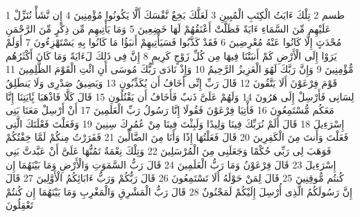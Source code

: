 \documentclass[20pt,a4paper]{article}
\title{}
\author{}
\date{}
\begin{document}
\pagecolor{cl_page}



{\tiny\colorbox{cl_aya}{1}} طسم
{\tiny\colorbox{cl_aya}{2}} تِلْكَ ءَايَتُ الْكِتَبِ الْمُبِينِ
{\tiny\colorbox{cl_aya}{3}} لَعَلَّكَ بَخِعٌ نَّفْسَكَ أَلَّا يَكُونُوا مُؤْمِنِينَ
{\tiny\colorbox{cl_aya}{4}} إِن نَّشَأْ نُنَزِّلْ عَلَيْهِم مِّنَ السَّمَاءِ ءَايَةً فَظَلَّتْ أَعْنَقُهُمْ لَهَا خَضِعِينَ
{\tiny\colorbox{cl_aya}{5}} وَمَا يَأْتِيهِم مِّن ذِكْرٍ مِّنَ الرَّحْمَنِ مُحْدَثٍ إِلَّا كَانُوا عَنْهُ مُعْرِضِينَ
{\tiny\colorbox{cl_aya}{6}} فَقَدْ كَذَّبُوا فَسَيَأْتِيهِمْ أَنبَؤُا مَا كَانُوا بِهِ يَسْتَهْزِءُونَ
{\tiny\colorbox{cl_aya}{7}} أَوَلَمْ يَرَوْا إِلَى الْأَرْضِ كَمْ أَنبَتْنَا فِيهَا مِن كُلِّ زَوْجٍ كَرِيمٍ
{\tiny\colorbox{cl_aya}{8}} إِنَّ فِى ذَلِكَ لَءَايَةً وَمَا كَانَ أَكْثَرُهُم مُّؤْمِنِينَ
{\tiny\colorbox{cl_aya}{9}} وَإِنَّ رَبَّكَ لَهُوَ الْعَزِيزُ الرَّحِيمُ
{\tiny\colorbox{cl_aya}{10}} وَإِذْ نَادَى رَبُّكَ مُوسَى أَنِ ائْتِ الْقَوْمَ الظَّلِمِينَ
{\tiny\colorbox{cl_aya}{11}} قَوْمَ فِرْعَوْنَ أَلَا يَتَّقُونَ
{\tiny\colorbox{cl_aya}{12}} قَالَ رَبِّ إِنِّى أَخَافُ أَن يُكَذِّبُونِ
{\tiny\colorbox{cl_aya}{13}} وَيَضِيقُ صَدْرِى وَلَا يَنطَلِقُ لِسَانِى فَأَرْسِلْ إِلَى هَرُونَ
{\tiny\colorbox{cl_aya}{14}} وَلَهُمْ عَلَىَّ ذَنبٌ فَأَخَافُ أَن يَقْتُلُونِ
{\tiny\colorbox{cl_aya}{15}} قَالَ كَلَّا فَاذْهَبَا بَِٔايَتِنَا إِنَّا مَعَكُم مُّسْتَمِعُونَ
{\tiny\colorbox{cl_aya}{16}} فَأْتِيَا فِرْعَوْنَ فَقُولَا إِنَّا رَسُولُ رَبِّ الْعَلَمِينَ
{\tiny\colorbox{cl_aya}{17}} أَنْ أَرْسِلْ مَعَنَا بَنِى إِسْرَءِيلَ
{\tiny\colorbox{cl_aya}{18}} قَالَ أَلَمْ نُرَبِّكَ فِينَا وَلِيدًا وَلَبِثْتَ فِينَا مِنْ عُمُرِكَ سِنِينَ
{\tiny\colorbox{cl_aya}{19}} وَفَعَلْتَ فَعْلَتَكَ الَّتِى فَعَلْتَ وَأَنتَ مِنَ الْكَفِرِينَ
{\tiny\colorbox{cl_aya}{20}} قَالَ فَعَلْتُهَا إِذًا وَأَنَا مِنَ الضَّالِّينَ
{\tiny\colorbox{cl_aya}{21}} فَفَرَرْتُ مِنكُمْ لَمَّا خِفْتُكُمْ فَوَهَبَ لِى رَبِّى حُكْمًا وَجَعَلَنِى مِنَ الْمُرْسَلِينَ
{\tiny\colorbox{cl_aya}{22}} وَتِلْكَ نِعْمَةٌ تَمُنُّهَا عَلَىَّ أَنْ عَبَّدتَّ بَنِى إِسْرَءِيلَ
{\tiny\colorbox{cl_aya}{23}} قَالَ فِرْعَوْنُ وَمَا رَبُّ الْعَلَمِينَ
{\tiny\colorbox{cl_aya}{24}} قَالَ رَبُّ السَّمَوَتِ وَالْأَرْضِ وَمَا بَيْنَهُمَا إِن كُنتُم مُّوقِنِينَ
{\tiny\colorbox{cl_aya}{25}} قَالَ لِمَنْ حَوْلَهُ أَلَا تَسْتَمِعُونَ
{\tiny\colorbox{cl_aya}{26}} قَالَ رَبُّكُمْ وَرَبُّ ءَابَائِكُمُ الْأَوَّلِينَ
{\tiny\colorbox{cl_aya}{27}} قَالَ إِنَّ رَسُولَكُمُ الَّذِى أُرْسِلَ إِلَيْكُمْ لَمَجْنُونٌ
{\tiny\colorbox{cl_aya}{28}} قَالَ رَبُّ الْمَشْرِقِ وَالْمَغْرِبِ وَمَا بَيْنَهُمَا إِن كُنتُمْ تَعْقِلُونَ
\end{document}
